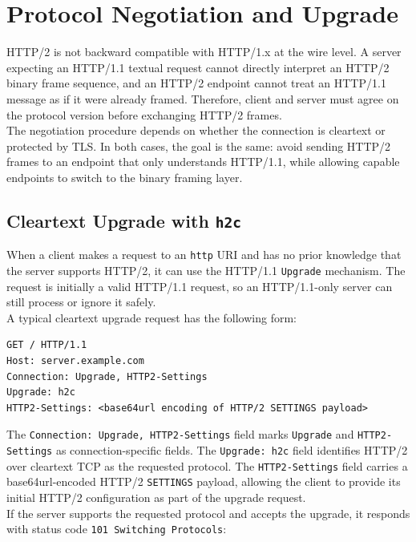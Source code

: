 \documentclass{scrbook}
\begin{document}
\section{Protocol Negotiation and Upgrade}

HTTP/2 is not backward compatible with HTTP/1.x at the wire level. A server expecting an HTTP/1.1 textual request cannot directly interpret an HTTP/2 binary frame sequence, and an HTTP/2 endpoint cannot treat an HTTP/1.1 message as if it were already framed. Therefore, client and server must agree on the protocol version before exchanging HTTP/2 frames.\\

The negotiation procedure depends on whether the connection is cleartext or protected by TLS. In both cases, the goal is the same: avoid sending HTTP/2 frames to an endpoint that only understands HTTP/1.1, while allowing capable endpoints to switch to the binary framing layer.

\subsection{Cleartext Upgrade with \texttt{h2c}}

When a client makes a request to an \texttt{http} URI and has no prior knowledge that the server supports HTTP/2, it can use the HTTP/1.1 \texttt{Upgrade} mechanism. The request is initially a valid HTTP/1.1 request, so an HTTP/1.1-only server can still process or ignore it safely.\\

A typical cleartext upgrade request has the following form:

\begin{lstlisting}
GET / HTTP/1.1
Host: server.example.com
Connection: Upgrade, HTTP2-Settings
Upgrade: h2c
HTTP2-Settings: <base64url encoding of HTTP/2 SETTINGS payload>
\end{lstlisting}

The \texttt{Connection: Upgrade, HTTP2-Settings} field marks \texttt{Upgrade} and \texttt{HTTP2-Settings} as connection-specific fields. The \texttt{Upgrade: h2c} field identifies HTTP/2 over cleartext TCP as the requested protocol. The \texttt{HTTP2-Settings} field carries a base64url-encoded HTTP/2 \texttt{SETTINGS} payload, allowing the client to provide its initial HTTP/2 configuration as part of the upgrade request.\\

If the server supports the requested protocol and accepts the upgrade, it responds with status code \texttt{101 Switching Protocols}:
\end{document}

